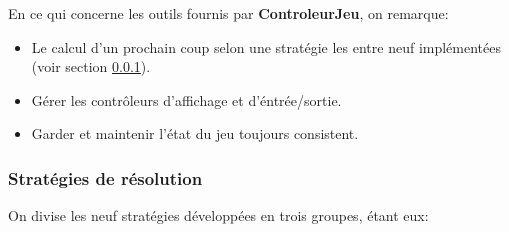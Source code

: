 \documentclass{article}
\begin{document}
\vspace{12pt}

En ce qui concerne les outils fournis par \textbf{ControleurJeu}, on remarque:

\vspace{12pt}

\begin{itemize}
  
  \item Le calcul d'un prochain coup selon une stratégie les entre neuf
  implémentées (voir section \ref{sec:strategie}). 

  \vspace{12pt}
  
  \item Gérer les contrôleurs d'affichage et d'éntrée/sortie.
  
  \vspace{12pt}
  
  \item Garder et maintenir l'état du jeu toujours consistent.
   
\end{itemize}

\subsubsection{Stratégies de résolution}
\label{sec:strategie}

On divise les neuf stratégies développées en trois groupes, étant eux: 
\vspace{12pt}
\end{document}

